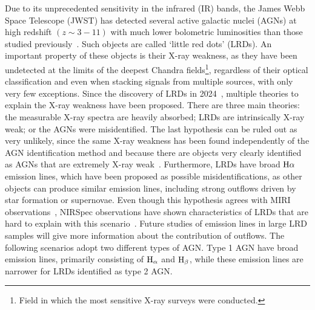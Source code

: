 Due to its unprecedented sensitivity in the infrared (IR) bands, the James Webb Space Telescope (JWST) has detected several active galactic nuclei (AGNs) at high redshift $(z\sim3-11)$ with much lower bolometric luminosities than those studied previously~\cite{Maiolini_2025}.
Such objects are called `little red dots' (LRDs).
An important property of these objects is their X-ray weakness, as they have been undetected at the limits of the deepest Chandra fields\footnote{Field in which the most sensitive X-ray surveys were conducted.}, regardless of their optical classification and even when stacking signals from multiple sources, with only very few exceptions.
Since the discovery of LRDs in 2024~\cite{matthee2024littlereddotsabundant}, multiple theories to explain the X-ray weakness have been proposed.
There are three main theories: the measurable X-ray spectra are heavily absorbed; LRDs are intrinsically X-ray weak; or the AGNs were misidentified. \newline
The last hypothesis can be ruled out as very unlikely, since the same X-ray weakness has been found independently of the AGN identification method and because there are objects very clearly identified as AGNs that are extremely X-ray weak~\cite{Maiolini_2025}.
Furthermore, LRDs have broad $\text H\alpha$ emission lines, which have been proposed as possible misidentifications, as other objects can produce similar emission lines, including strong outflows driven by star formation or supernovae.
Even though this hypothesis agrees with MIRI observations~\cite{PerezGonzalez_2024}, NIRSpec observations have shown characteristics of LRDs that are hard to explain with this scenario~\cite{Maiolini_2025, Yue_2024}. 
Future studies of emission lines in large LRD samples will give more information about the contribution of outflows. \newline
The following scenarios adopt two different types of AGN\@.
Type 1 AGN have broad emission lines, primarily consisting of $\text H_\alpha$ and $\text H_\beta$, while these emission lines are narrower for LRDs identified as type 2 AGN\@.

